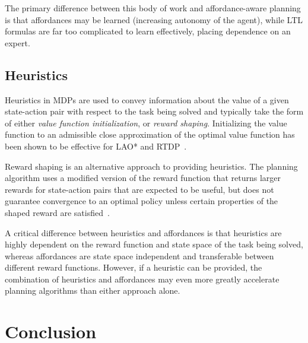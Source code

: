 \documentclass[conference]{IEEEtran}
\begin{document}
The primary difference between this body of work and affordance-aware planning is that affordances may be learned (increasing autonomy of the agent), while LTL formulas are far too complicated to learn effectively, placing dependence on an expert.

\subsection{Heuristics}
Heuristics in MDPs are used to convey information about the value of a given state-action pair with respect to the task being solved and typically take the form of either {\em value function initialization},
or {\em reward shaping}. Initializing the value function to an admissible close approximation of the optimal value function has been shown to be effective for LAO* and RTDP~\cite{Hansen:1999qf}.

Reward shaping is an alternative approach to providing heuristics. The planning algorithm uses a modified version of the reward function that returns larger rewards for state-action pairs that are expected to be useful, but does not guarantee convergence to an optimal policy unless certain properties of the shaped reward are satisfied~\cite{potshap}.

A critical difference between heuristics and affordances is that heuristics are highly dependent on the reward function and state space of the task being solved, whereas affordances are state space independent and transferable between different reward functions. However, if a heuristic can be provided, the combination of heuristics and affordances may even more greatly accelerate planning algorithms than either approach alone.


\section{Conclusion}
\label{sec:conclusion}
\end{document}
